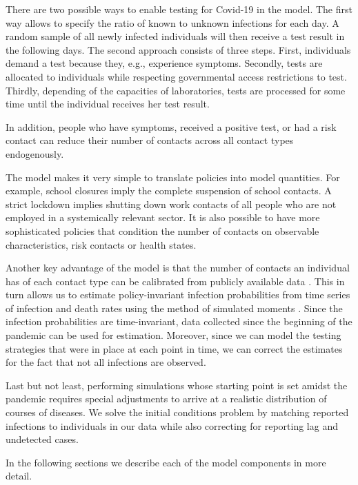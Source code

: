 There are two possible ways to enable testing for Covid-19 in the model. The first way allows to specify the ratio of known to unknown infections for each day. A random sample of all newly infected individuals will then receive a test result in the following days. The second approach consists of three steps. First, individuals demand a test because they, e.g., experience symptoms. Secondly, tests are allocated to individuals while respecting governmental access restrictions to test. Thirdly, depending of the capacities of laboratories, tests are processed for some time until the individual receives her test result.

In addition, people who have symptoms, received a positive test, or had a risk contact can reduce their number of contacts across all contact types endogenously.

The model makes it very simple to translate policies into model quantities. For example, school closures imply the complete suspension of school contacts. A strict lockdown implies shutting down work contacts of all people who are not employed in a systemically relevant sector. It is also possible to have more sophisticated policies that condition the number of contacts on observable characteristics, risk contacts or health states.

Another key advantage of the model is that the number of contacts an individual has of each contact type can be calibrated from publicly available data \citep{Mossong2008}. This in turn allows us to estimate policy-invariant infection probabilities from time series of infection and death rates using the method of simulated moments \citep{McFadden1989}. Since the infection probabilities are time-invariant, data collected since the beginning of the pandemic can be used for estimation. Moreover, since we can model the testing strategies that were in place at each point in time, we can correct the estimates for the fact that not all infections are observed.

Last but not least, performing simulations whose starting point is set amidst the pandemic requires special adjustments to arrive at a realistic distribution of courses of diseases. We solve the initial conditions problem by matching reported infections to individuals in our data while also correcting for reporting lag and undetected cases.

In the following sections we describe each of the model components in more detail.
